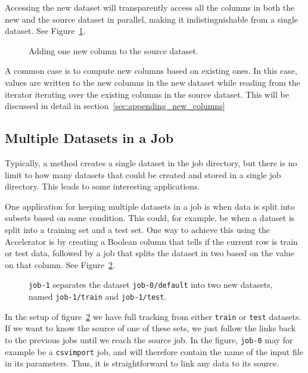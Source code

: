 Accessing the new dataset will transparently access all the columns in
both the new and the source dataset in parallel, making it
indistinguishable from a single dataset.  See
Figure~\ref{fig:dep_dataset_append_column}.

\begin{figure}[b]
  \begin{center}
    
    \caption{Adding one new column to the source dataset.}
    \label{fig:dep_dataset_append_column}
  \end{center}
\end{figure}

A common case is to compute new columns based on existing ones.  In
this case, values are written to the new columns in the new dataset
while reading from the iterator iterating over the existing columns in
the source dataset.  This will be discussed in detail in
section~\ref{sec:appending_new_columns}



\subsection{Multiple Datasets in a Job}

Typically, a method creates a single dataset in the job directory, but
there is no limit to how many datasets that could be created and
stored in a single job directory.  This leads to some interesting
applications.

One application for keeping multiple datasets in a job is when data is
split into subsets based on some condition.  This could, for example,
be when a dataset is split into a training set and a test set.  One
way to achieve this using the Accelerator is by creating a Boolean
column that tells if the current row is train or test data, followed
by a job that splits the dataset in two based on the value on that
column.  See Figure~\ref{fig:dep_dataset_csvimport_chain}.

\begin{figure}[h!]
  \hspace{1cm}
  
  \caption{\texttt{job-1} separates the dataset
    \texttt{job-0/default} into two new datasets, named
    \texttt{job-1/train} and \texttt{job-1/test}.}
  \label{fig:dep_dataset_csvimport_chain}
\end{figure}

In the setup of figure~\ref{fig:dep_dataset_csvimport_chain} we have
full tracking from either \texttt{train} or \texttt{test} datasets.
If we want to know the source of one of these sets, we just follow the
links back to the previous jobs until we reach the source job.  In the
figure, \texttt{job-0} may for example be a \texttt{csvimport} job,
and will therefore contain the name of the input file in its
parameters.  Thus, it is straightforward to link any data to its
source.

